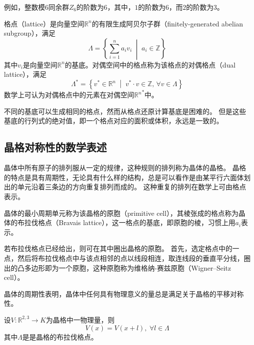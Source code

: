 例如，整数模6同余群$Z_6$的阶数为$6$，其中，$1$的阶数为$6$，而$2$的阶数为$3$。

\begin{definition}
    格点（lattice）是向量空间$\mathbb R^n$的有限生成阿贝尔子群（finitely-generated abelian subgroup），满足
    \begin{equation}\Lambda = \left\{ \sum_{i=1}^n a_i v_i \; \middle\vert\; a_i \in \mathbb Z \right\}\end{equation}
    其中$v_i$是向量空间$\mathbb R^n$的基底。对偶空间中的格点称为该格点的对偶格点（dual lattice），满足
    \begin{equation}\Lambda^* = \left\{ v^* \in \mathbb R^n \; \middle\vert \; v^* \cdot v \in \mathbb Z ,\, \forall v \in \Lambda \right\}\end{equation}
    数学上可认为对偶格点中的元素在对偶空间${{\mathbb{R}}^n}^*$中。
\end{definition}

不同的基底可以生成相同的格点，然而从格点还原计算基底是困难的。
但是这些基底的行列式的绝对值，即一个格点对应的面积或体积，永远是一致的。

\subsection{晶格对称性的数学表述}

晶体中所有原子的排列服从一定的规律，这种规则的排列称为晶体的晶格。
晶格的特点是具有周期性，无论具有什么样的结构，总是可以看作是由某平行六面体划出的单元沿着三条边的方向重复排列而成的。
这种重复的排列在数学上可由格点表示。

\begin{definition}
    晶体的最小周期单元称为该晶格的原胞（primitive cell），其棱张成的格点称为晶体的布拉伐格点（Bravais lattice），这一格点的基底，即原胞的棱，习惯上用$a_i$表示。
\end{definition}

若布拉伐格点已经给出，则可在其中圈出晶格的原胞。
首先，选定格点中的一点，然后将布拉伐格点中与该点相邻的点以线段相连，取连线段的垂直平分线，圈出的凸多边形即为一个原胞，这种原胞称为维格纳-赛兹原胞（Wigner–Seitz cell）。

晶体的周期性表明，晶体中任何具有物理意义的量总是满足关于晶格的平移对称性。

\begin{proposition}
    设$V: \mathbb R^{2,3} \to K$为晶格中一物理量，则
    \begin{equation}V(x) = V(x + l), \; \forall l \in \Lambda\end{equation}
    其中$\Lambda$是是晶格的布拉伐格点。
\end{proposition}

